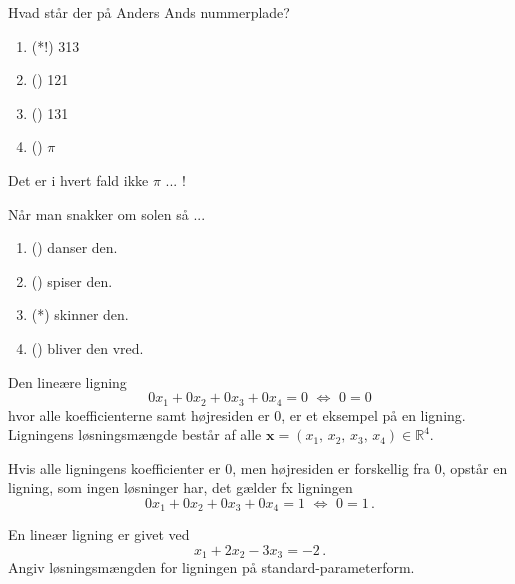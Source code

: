 \begin{exercise}
	\begin{question}
		Hvad står der på Anders Ands nummerplade?
		\begin{enumerate}
			\item (*!) 313
			\item () 121
			\item () 131
			\item () $\pi$
		\end{enumerate}
	\end{question}
	\begin{facit}
		Det er i hvert fald ikke $\pi$ ... !
	\end{facit}
	\begin{question}
		Når man snakker om solen så ...
		\begin{enumerate}
			\item () danser den.
			\item () spiser den.
			\item (*) skinner den.
			\item () bliver den vred.
		\end{enumerate}
	\end{question}
\end{exercise}

\begin{example}\label{TN2.2}
Den lineære ligning
\begin{equation}
0x_1+0x_2+0x_3+0x_4=0\,\,\Leftrightarrow\,\,0=0
\end{equation}
hvor alle koefficienterne samt højresiden er 0, er et eksempel på en  ligning. Ligningens løsningsmængde består af alle $\mathbf x=(x_1,\,x_2,\,x_3,\,x_4) \in \mathbb R^4$.\bs

Hvis alle ligningens koefficienter er 0, men højresiden er forskellig fra 0, opstår en  ligning, som ingen løsninger har, det gælder fx ligningen
\begin{equation}
0x_1+0x_2+0x_3+0x_4=1\,\,\Leftrightarrow\,\,0=1\,.
\end{equation}
\end{example}


\begin{exercise}\label{TN2.3}
En lineær ligning er givet ved
\begin{equation}
x_1+2x_2-3x_3=-2\,.
\end{equation}
Angiv løsningsmængden for ligningen på standard-parameterform.
\end{exercise}


